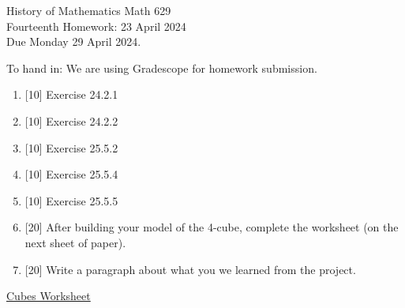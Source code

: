\documentclass[12pt]{article}
\begin{document}
\LARGE 
\noindent
{\color{Maroon}History of Mathematics \hfill Math 629}\vspace{2pt}\\
\large
Fourteenth Homework: \hfill 23 April 2024\\
Due Monday 29 April 2024.
\normalsize\vspace{10pt}

To hand in: We are using Gradescope for homework submission.

\begin{enumerate}


\item  {[10]}  Exercise 24.2.1
    
\item  {[10]}  Exercise 24.2.2
    
\item  {[10]}  Exercise 25.5.2
    
\item  {[10]}  Exercise 25.5.4
    
\item  {[10]}  Exercise 25.5.5

\item {[20]} After building your model of the 4-cube, complete the worksheet (on the next sheet of paper).

\item {[20]} Write a paragraph about what you we learned from the project. 
  
\end{enumerate}

\newpage


\begin{center}
{\color{Maroon}\underline{{\Large\sf Cubes Worksheet}}}
\end{center}
\end{document}
